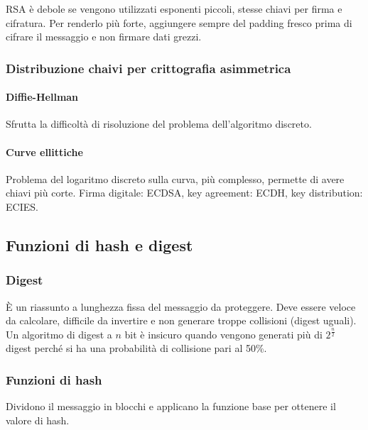 \documentclass[11pt]{article}
\begin{document}
RSA è debole se vengono utilizzati esponenti piccoli, stesse chiavi per firma e cifratura. Per renderlo più forte, 
aggiungere sempre del padding fresco prima di cifrare il messaggio e non firmare dati grezzi.
\subsubsection{Distribuzione chaivi per crittografia asimmetrica}
\paragraph*{Diffie-Hellman}
Sfrutta la difficoltà di risoluzione del problema dell'algoritmo discreto. 
\paragraph*{Curve ellittiche}
Problema del logaritmo discreto sulla curva, più complesso, permette di avere chiavi più corte. Firma digitale: ECDSA, key
agreement: ECDH, key distribution: ECIES.
\subsection{Funzioni di hash e digest}
\subsubsection{Digest}
È un riassunto a lunghezza fissa del messaggio da proteggere. Deve essere veloce da calcolare, difficile da invertire e 
non generare troppe collisioni (digest uguali). Un algoritmo di digest a $n$ bit è insicuro quando vengono generati più 
di $2^{\frac{n}{2}}$ digest perché si ha una probabilità di collisione pari al 50\%.
\subsubsection{Funzioni di hash}
Dividono il messaggio in blocchi e applicano la funzione base per ottenere il valore di hash.
\end{document}
